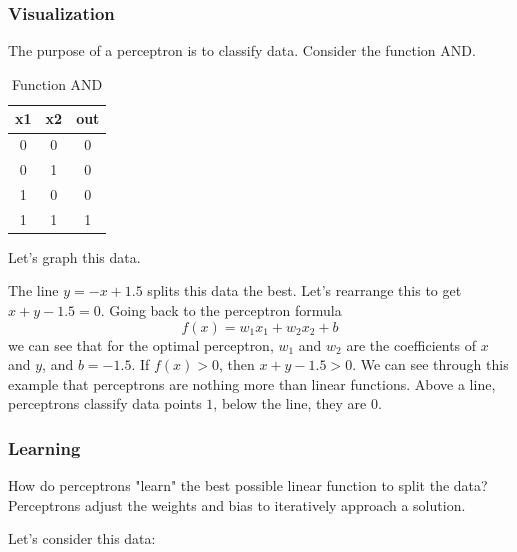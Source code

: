\subsubsection{Visualization}

The purpose of a perceptron is to classify data. Consider the function AND.

\begin{table}[H]
	\centering
	\begin{tabular}{ |c|c|c| } 
		\hline
		x1 & x2 & out \\
		\hline
		0 & 0 & 0 \\ 
		0 & 1 & 0 \\ 
		1 & 0 & 0 \\ 
		1 & 1 & 1 \\ 
		\hline
	\end{tabular}
	\caption{Function AND}
	\label{t:and}
\end{table}
Let's graph this data.
\begin{center}
\end{center}

The line $y = -x + 1.5$ splits this data the best.
Let's rearrange this to get $x + y - 1.5 = 0$. 
Going back to the perceptron formula
\[f(x) = w_1x_1 + w_2x_2 + b\]
we can see that for the optimal perceptron,  $w_1$ and $w_2$ are the coefficients of $x$ and $y$, and $b=-1.5$. If $f(x) > 0$, then $x + y - 1.5>0$. We can see through this example that perceptrons are nothing more than linear functions. Above a line, perceptrons classify data points $1$, below the line, they are $0$.

\subsubsection{Learning}

How do perceptrons "learn" the best possible linear function to split the data? Perceptrons adjust the weights and bias to iteratively approach a solution.

Let's consider this data:
\begin{center}
\end{center}

